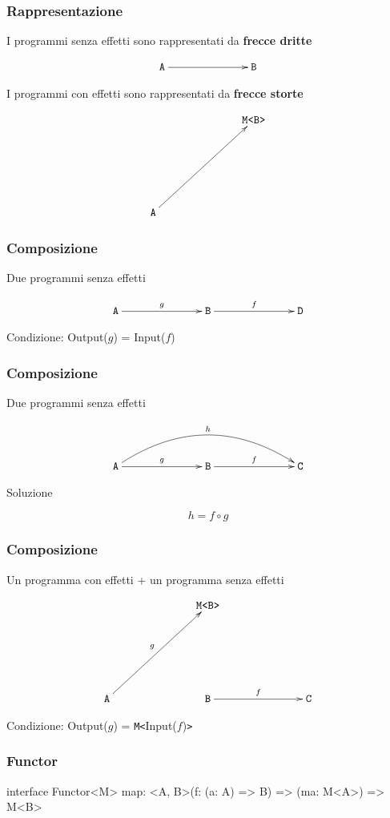 \documentclass{beamer}
\newenvironment{code}
  {\vspace{0.5cm} \VerbatimEnvironment\begin{typescriptcode}}
  {\end{typescriptcode} \vspace{0.2cm}}
\begin{document}
\begin{frame}
\frametitle{Rappresentazione}

I programmi senza effetti sono rappresentati da \textbf{frecce dritte}

\[
\xymatrixrowsep{2.5cm}
\xymatrixcolsep{2.5cm}
\xymatrix{
  \texttt{A} \ar[r] & \texttt{B}
}
\]

I programmi con effetti sono rappresentati da \textbf{frecce storte}

\[
\xymatrixrowsep{2.5cm}
\xymatrixcolsep{2.5cm}
\xymatrix{
  & \texttt{M<B>} \\
  \texttt{A} \ar[ur]
}
\]

\end{frame}

\begin{frame}
\frametitle{Composizione}

Due programmi senza effetti

\[
\xymatrixrowsep{2.5cm}
\xymatrixcolsep{2.5cm}
\xymatrix{
  \texttt{A} \ar[r]^{g} & \texttt{B} \ar[r]^{f} & \texttt{D}
}
\]

Condizione: Output($g$) = Input($f$)

\end{frame}

\begin{frame}
\frametitle{Composizione}

Due programmi senza effetti

\[
\xymatrixrowsep{2.5cm}
\xymatrixcolsep{2.5cm}
\xymatrix{
  \texttt{A} \ar[r]^{g} \ar@/^1cm/[rr]^{h} & \texttt{B} \ar[r]^{f} & \texttt{C}
}
\]

Soluzione

$$
h = f \circ g
$$

\end{frame}

\begin{frame}
\frametitle{Composizione}

Un programma con effetti + un programma senza effetti

\[
\xymatrixrowsep{2.5cm}
\xymatrixcolsep{2.5cm}
\xymatrix{
  & \texttt{M<B>} \\
  \texttt{A} \ar[ur]^{g} & \texttt{B} \ar[r]^{f} & \texttt{C}
}
\]

Condizione: Output($g$) = \texttt{M<}Input($f$)\texttt{>}

\end{frame}

\begin{frame}[fragile]
\frametitle{Functor}

\begin{code}
interface Functor<M> {
  map: <A, B>(f: (a: A) => B) => (ma: M<A>) => M<B>
}
\end{code}

\end{frame}
\end{document}
